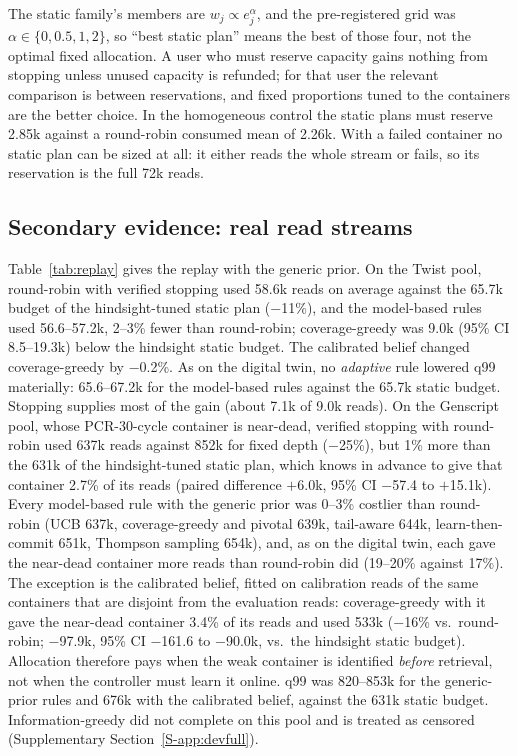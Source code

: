 \documentclass[conference,onecolumn,11pt]{IEEEtran}
\begin{document}
The static family's members are $w_j\propto e_j^{\alpha}$, and the pre-registered grid was
$\alpha\in\{0,0.5,1,2\}$, so ``best static plan'' means the best of those four, not the optimal fixed
allocation.  A user who must reserve capacity gains nothing from stopping unless unused capacity is
refunded; for that user the relevant comparison is between reservations, and fixed proportions tuned to
the containers are the better choice.  In the homogeneous control the static plans must reserve 2.85k
against a round-robin consumed mean of 2.26k.  With a failed container no static plan can be sized at
all: it either reads the whole stream or fails, so its reservation is the full 72k reads.

\subsection{Secondary evidence: real read streams}\label{sec:res-replay}

Table~\ref{tab:replay} gives the replay with the generic prior.  On the Twist pool, round-robin with
verified stopping used 58.6k reads on average against the 65.7k budget of the hindsight-tuned static plan
($-$11\%), and the model-based rules used 56.6--57.2k, 2--3\% fewer than round-robin; coverage-greedy was
9.0k (95\% CI 8.5--19.3k) below the hindsight static budget.  The calibrated belief changed
coverage-greedy by $-$0.2\%.  As on the digital twin, no \emph{adaptive} rule lowered q99 materially:
65.6--67.2k for the model-based rules against the 65.7k static budget.  Stopping supplies most of the
gain (about 7.1k of 9.0k reads).  On the Genscript pool, whose PCR-30-cycle container is near-dead,
verified stopping with round-robin used 637k reads against 852k for fixed depth ($-$25\%), but 1\% more
than the 631k of the hindsight-tuned static plan, which knows in advance to give that container 2.7\% of
its reads (paired difference $+$6.0k, 95\% CI $-$57.4 to $+$15.1k).  Every model-based rule with the
generic prior was 0--3\% costlier than round-robin (UCB 637k, coverage-greedy and pivotal 639k, tail-aware
644k, learn-then-commit 651k, Thompson sampling 654k), and, as on the digital twin, each gave the
near-dead container more reads than round-robin did (19--20\% against 17\%).  The exception is the
calibrated belief, fitted on calibration reads of the same containers that are disjoint from the
evaluation reads: coverage-greedy with it gave the near-dead container 3.4\% of its reads and used 533k
($-$16\% vs.\ round-robin; $-$97.9k, 95\% CI $-$161.6 to $-$90.0k, vs.\ the hindsight static budget).
Allocation therefore pays when the weak container is identified \emph{before} retrieval, not when the
controller must learn it online.  q99 was 820--853k for the generic-prior rules and 676k with the
calibrated belief, against the 631k static budget.  Information-greedy did not complete on this pool and
is treated as censored (Supplementary Section~\ref{S-app:devfull}).
\end{document}
